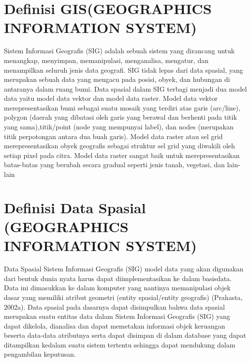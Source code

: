 \section{Definisi GIS(GEOGRAPHICS INFORMATION SYSTEM)}
Sistem Informasi Geografis (SIG) adalah sebuah sistem yang dirancang untuk menangkap, menyimpan, memanipulasi, menganalisa, mengatur, dan menampilkan seluruh jenis data geografi. SIG tidak lepas dari data spasial, yang merupakan sebuah data yang mengacu pada posisi, obyek, dan
hubungan di antaranya dalam ruang bumi. Data spasial dalam SIG terbagi menjadi dua model data
yaitu model data vektor dan model data raster. Model data vektor merepresentasikan bumi sebagai
suatu mosaik yang terdiri atas garis (arc/line), polygon (daerah yang dibatasi oleh garis yang
berawal dan berhenti pada titik yang sama),titik/point (node yang mempunyai label), dan nodes
(merupakan titik perpotongan antara dua buah garis).
Model data raster atau sel grid merepresentasikan obyek geografis sebagai struktur sel grid yang diwakili oleh setiap pixel pada citra. Model data raster sangat baik untuk merepresentasikan batas-batas yang berubah secara gradual seperti jenis tanah, vegetasi, dan lain-lain

\section{Definisi Data Spasial (GEOGRAPHICS INFORMATION SYSTEM)}
Data Spasial Sistem Informasi Geografis (SIG) model data yang akan digunakan dari bentuk dunia nyata harus dapat diimplementasikan ke dalam basisdata. Data ini dimasukkan ke dalam komputer yang nantinya memanipulasi objek dasar yang memiliki atribut geometri (entity spasial/entity geografis) 
(Prahasta, 2002a). Data spasial pada dasarnya dapat disimpulkan bahwa data spasial merupakan suatu entitas data dalam Sistem Informasi Geografis (SIG) yang dapat dikelola, dianalisa dan dapat memetakan informasi objek keruangan beserta data-data atributnya serta dapat disimpan di dalam database yang dapat ditampilkan kedalam suatu sistem tertentu sehingga dapat mendukung dalam pengambilan keputusan. 

